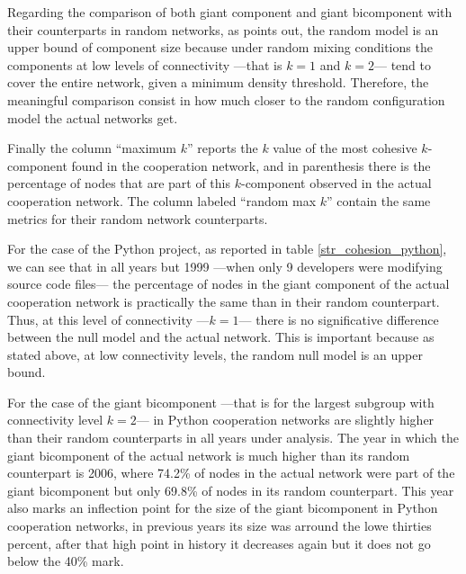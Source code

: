 Regarding the comparison of both giant component and giant bicomponent with their counterparts in random networks, as \citet[229-230]{moody:2004} points out, the random model is an upper bound of component size because under random mixing conditions the components at low levels of connectivity ---that is $k = 1$ and $k = 2$--- tend to cover the entire network, given a minimum density threshold. Therefore, the meaningful comparison consist in how much closer to the random configuration model the actual networks get.

Finally the column ``maximum $k$'' reports the $k$ value of the most cohesive $k$-component found in the cooperation network, and in parenthesis there is the percentage of nodes that are part of this $k$-component observed in the actual cooperation network. The column labeled ``random max $k$'' contain the same metrics for their random network counterparts. 

For the case of the Python project, as reported in table \ref{str_cohesion_python}, we can see that in all years but 1999 ---when only 9 developers were modifying source code files--- the percentage of nodes in the giant component of the actual cooperation network is practically the same than in their random counterpart. Thus, at this level of connectivity ---$k = 1$--- there is no significative difference between the null model and the actual network. This is important because as stated above, at low connectivity levels, the random null model is an upper bound.

For the case of the giant bicomponent ---that is for the largest subgroup with connectivity level $k = 2$--- in Python cooperation networks are slightly higher than their random counterparts in all years under analysis. The year in which the giant bicomponent of the actual network is much higher than its random counterpart is 2006, where 74.2\% of nodes in the actual network were part of the giant bicomponent but only 69.8\% of nodes in its random counterpart. This year also marks an inflection point for the size of the giant bicomponent in Python cooperation networks, in previous years its size was arround the lowe thirties percent, after that high point in history it decreases again but it does not go below the 40\% mark. 


